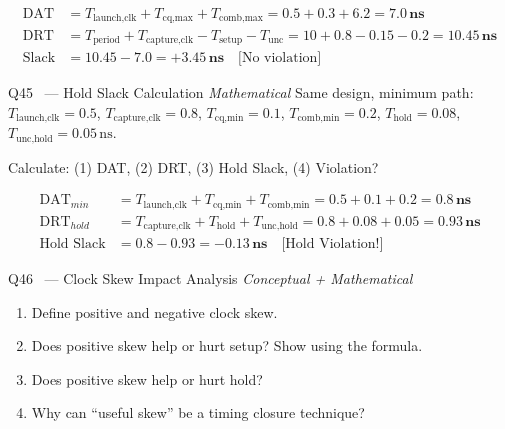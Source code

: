 \documentclass[12pt,a4paper]{article}
\newcommand{\advanced}{%
  \fbox{\textcolor{advred}{\bfseries\sffamily\small ADVANCED}}}
\begin{document}
\begin{answerbox}
\begin{align*}
\text{DAT} &= T_{\text{launch,clk}} + T_{\text{cq,max}} + T_{\text{comb,max}} = 0.5 + 0.3 + 6.2 = \mathbf{7.0\,ns}\\
\text{DRT} &= T_{\text{period}} + T_{\text{capture,clk}} - T_{\text{setup}} - T_{\text{unc}} = 10 + 0.8 - 0.15 - 0.2 = \mathbf{10.45\,ns}\\
\text{Slack} &= 10.45 - 7.0 = \mathbf{+3.45\,ns} \quad \text{[No violation]}
\end{align*}
\end{answerbox}

\begin{questionbox}{Q45 \advanced\ --- Hold Slack Calculation \hfill\textit{Mathematical}}
Same design, minimum path: $T_{\text{launch,clk}}=0.5$, $T_{\text{capture,clk}}=0.8$, $T_{\text{cq,min}}=0.1$, $T_{\text{comb,min}}=0.2$, $T_{\text{hold}}=0.08$, $T_{\text{unc,hold}}=0.05\,\text{ns}$.

Calculate: (1) DAT, (2) DRT, (3) Hold Slack, (4) Violation?
\end{questionbox}

\begin{answerbox}
\begin{align*}
\text{DAT}_{min} &= T_{\text{launch,clk}} + T_{\text{cq,min}} + T_{\text{comb,min}} = 0.5 + 0.1 + 0.2 = \mathbf{0.8\,ns}\\
\text{DRT}_{hold} &= T_{\text{capture,clk}} + T_{\text{hold}} + T_{\text{unc,hold}} = 0.8 + 0.08 + 0.05 = \mathbf{0.93\,ns}\\
\text{Hold Slack} &= 0.8 - 0.93 = \mathbf{-0.13\,ns} \quad \text{[Hold Violation!]}
\end{align*}
\end{answerbox}

\begin{questionbox}{Q46 \advanced\ --- Clock Skew Impact Analysis \hfill\textit{Conceptual + Mathematical}}
\begin{enumerate}[label=\textbf{\alph*)}]
  \item Define positive and negative clock skew.
  \item Does positive skew help or hurt setup? Show using the formula.
  \item Does positive skew help or hurt hold?
  \item Why can ``useful skew'' be a timing closure technique?
\end{enumerate}
\end{questionbox}
\end{document}
